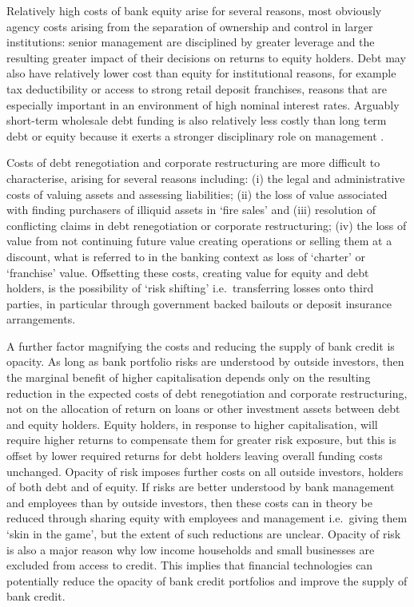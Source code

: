 \documentclass[
  12,
]{article}
\begin{document}
Relatively high costs of bank equity arise for several reasons, most obviously agency costs arising from the separation of ownership and control in larger institutions: senior management are disciplined by greater leverage and the resulting greater impact of their decisions on returns to equity holders. Debt may also have relatively lower cost than equity for institutional reasons, for example tax deductibility or access to strong retail deposit franchises, reasons that are especially important in an environment of high nominal interest rates. Arguably short-term wholesale debt funding is also relatively less costly than long term debt or equity because it exerts a stronger disciplinary role on management \citep{calomiris1991role}.

Costs of debt renegotiation and corporate restructuring are more difficult to characterise, arising for several reasons including: (i) the legal and administrative costs of valuing assets and assessing liabilities; (ii) the loss of value associated with finding purchasers of illiquid assets in `fire sales' and (iii) resolution of conflicting claims in debt renegotiation or corporate restructuring; (iv) the loss of value from not continuing future value creating operations or selling them at a discount, what is referred to in the banking context as loss of `charter' or `franchise' value. Offsetting these costs, creating value for equity and debt holders, is the possibility of `risk shifting' i.e.~transferring losses onto third parties, in particular through government backed bailouts or deposit insurance arrangements.

A further factor magnifying the costs and reducing the supply of bank credit is opacity. As long as bank portfolio risks are understood by outside investors, then the marginal benefit of higher capitalisation depends only on the resulting reduction in the expected costs of debt renegotiation and corporate restructuring, not on the allocation of return on loans or other investment assets between debt and equity holders. Equity holders, in response to higher capitalisation, will require higher returns to compensate them for greater risk exposure, but this is offset by lower required returns for debt holders leaving overall funding costs unchanged. Opacity of risk imposes further costs on all outside investors, holders of both debt and of equity. If risks are better understood by bank management and employees than by outside investors, then these costs can in theory be reduced through sharing equity with employees and management i.e.~giving them `skin in the game', but the extent of such reductions are unclear. Opacity of risk is also a major reason why low income households and small businesses are excluded from access to credit. This implies that financial technologies can potentially reduce the opacity of bank credit portfolios and improve the supply of bank credit.
\end{document}

